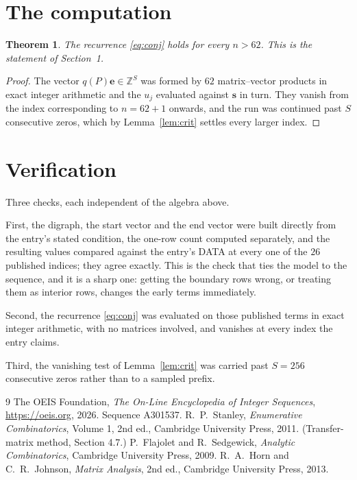 \documentclass[11pt,a4paper]{article}
\theoremstyle{plain}
\newtheorem{theorem}{Theorem}
\theoremstyle{definition}
\begin{document}
\section{The computation}

\begin{theorem}
The recurrence \eqref{eq:conj} holds for every $n>62$. This is the statement of
Section~1.
\end{theorem}

\begin{proof}
The vector $q(P)\mathbf{e}\in\mathbb{Z}^{S}$ was formed by $62$ matrix--vector
products in exact integer arithmetic and the $u_j$ evaluated against $\mathbf{s}$ in turn.
They vanish from the index corresponding to $n=62+1$ onwards, and the run was continued
past $S$ consecutive zeros, which by Lemma~\ref{lem:crit} settles every larger index.
\end{proof}

\section{Verification}

Three checks, each independent of the algebra above.

First, the digraph, the start vector and the end vector were built directly from the
entry's stated condition, the one-row count computed separately, and the resulting values
compared against the entry's DATA at every one of the $26$ published indices; they
agree exactly. This is the check that ties the model to the sequence, and it is a sharp one:
getting the boundary rows wrong, or treating them as interior rows, changes the early terms
immediately.

Second, the recurrence \eqref{eq:conj} was evaluated on those published terms in exact
integer arithmetic, with no matrices involved, and vanishes at every index the entry claims.

Third, the vanishing test of Lemma~\ref{lem:crit} was carried past $S=256$ consecutive
zeros rather than to a sampled prefix.

\begin{thebibliography}{9}
 The OEIS Foundation, \emph{The On-Line Encyclopedia of Integer
Sequences}, \url{https://oeis.org}, 2026. Sequence A301537.
 R.~P.~Stanley, \emph{Enumerative Combinatorics}, Volume 1, 2nd ed.,
Cambridge University Press, 2011. (Transfer-matrix method, Section 4.7.)
 P.~Flajolet and R.~Sedgewick, \emph{Analytic Combinatorics}, Cambridge
University Press, 2009.
 R.~A.~Horn and C.~R.~Johnson, \emph{Matrix Analysis}, 2nd ed., Cambridge
University Press, 2013.
\end{thebibliography}
\end{document}
